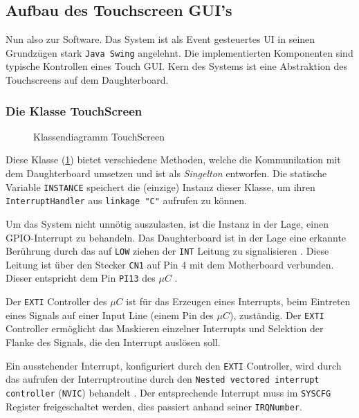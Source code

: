 \subsection{Aufbau des Touchscreen GUI's}
	Nun also zur Software. 
	Das System ist als Event gesteuertes UI in seinen Grundzügen stark \texttt{Java Swing} angelehnt.
	Die implementierten Komponenten sind typische Kontrollen eines Touch GUI.
	Kern des Systems ist eine Abstraktion des Touchscreens auf dem Daughterboard.
	
	\subsubsection{Die Klasse TouchScreen}\label{sec:touchscreen_class}
		\begin{figure}
			\scalebox{0.75}{
				\begin{tikzpicture}
					
				\end{tikzpicture}
			}
			\caption{Klassendiagramm TouchScreen}
			\label{uml-touchscreen}
		\end{figure}
		Diese Klasse (\ref{uml-touchscreen}) bietet verschiedene Methoden, welche die Kommunikation mit dem Daughterboard umsetzen und ist als \emph{Singelton} entworfen.
		Die statische Variable \texttt{INSTANCE} speichert die (einzige) Instanz dieser Klasse, um ihren \texttt{InterruptHandler} aus \texttt{linkage "C"} aufrufen zu können.
		
		Um das System nicht unnötig auszulasten, ist die Instanz in der Lage, einen GPIO-Interrupt zu behandeln.
		Das Daughterboard ist in der Lage eine erkannte Berührung durch das auf \texttt{LOW} ziehen der \texttt{INT} Leitung zu signalisieren \cite[8\psq]{ts-userManual}.
		Diese Leitung ist über den Stecker \texttt{CN1} auf Pin 4 mit dem Motherboard verbunden. Dieser entspricht dem Pin \texttt{PI13} des $\mu C$ \cite[27\psq]{disco-userManual}.
		
		Der \texttt{EXTI} Controller des $\mu C$ ist für das Erzeugen eines Interrupts, beim Eintreten eines Signals auf einer Input Line (einem Pin des $\mu C$), zuständig.
		Der \texttt{EXTI} Controller ermöglicht das Maskieren einzelner Interrupts und Selektion der Flanke des Signals, die den Interrupt auslösen soll. \cite[319\psqq]{stm32_refManual}
		
		Ein ausstehender Interrupt, konfiguriert durch den \texttt{EXTI} Controller, wird durch das aufrufen der Interruptroutine durch den \texttt{Nested vectored interrupt controller} (\texttt{NVIC}) behandelt \cite[313\psqq]{stm32_refManual}.
		Der entsprechende Interrupt muss im \texttt{SYSCFG} Register freigeschaltet werden, dies passiert anhand seiner \texttt{IRQNumber}.
		
